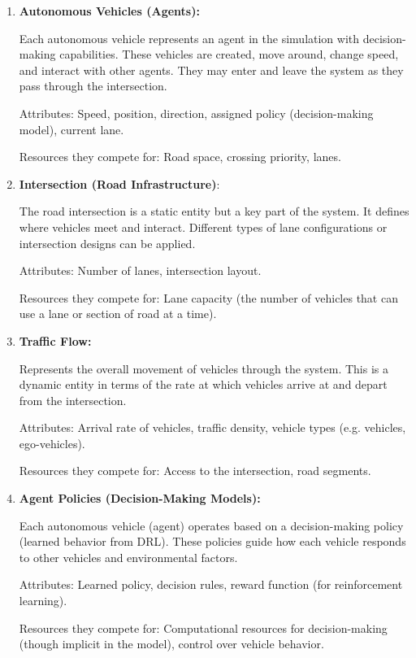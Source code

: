 \begin{enumerate}
    
    \item \textbf{Autonomous Vehicles (Agents):}
    
          Each autonomous vehicle represents an agent in the simulation with decision-making capabilities. These vehicles are created, move around, change speed, and interact with other agents. They may enter and leave the system as they pass through the intersection.
          
          Attributes: Speed, position, direction, assigned policy (decision-making model), current lane.
          
          Resources they compete for: Road space, crossing priority, lanes.
          
    \item \textbf{Intersection (Road Infrastructure)}:
    
          The road intersection is a static entity but a key part of the system. It defines where vehicles meet and interact. Different types of lane configurations or intersection designs can be applied.
          
          Attributes: Number of lanes, intersection layout.
          
          Resources they compete for: Lane capacity (the number of vehicles that can use a lane or section of road at a time).
          
    \item \textbf{Traffic Flow:}
    
          Represents the overall movement of vehicles through the system. This is a dynamic entity in terms of the rate at which vehicles arrive at and depart from the intersection.
          
          Attributes: Arrival rate of vehicles, traffic density, vehicle types (e.g. vehicles, ego-vehicles).
          
          Resources they compete for: Access to the intersection, road segments.
          
    \item \textbf{Agent Policies (Decision-Making Models):}
    
          Each autonomous vehicle (agent) operates based on a decision-making policy (learned behavior from DRL). These policies guide how each vehicle responds to other vehicles and environmental factors.
          
          Attributes: Learned policy, decision rules, reward function (for reinforcement learning).
          
          Resources they compete for: Computational resources for decision-making (though implicit in the model), control over vehicle behavior.
\end{enumerate}

